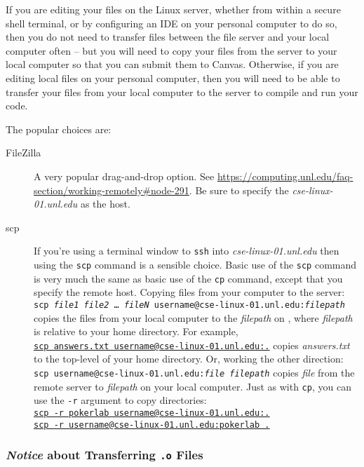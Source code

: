If you are editing your files on the Linux server, whether from within a secure shell terminal, or by configuring an IDE on your personal computer to do so,
then you do not need to transfer files between the file server and your local computer often -- but you will need to copy your files from the server to your local computer so that you can submit them to Canvas.
Otherwise, if you are editing local files on your personal computer, then you will need to be able to transfer your files from your local computer to the server to compile and run your code.

The popular choices are:
\begin{description}
    \item[FileZilla] A very popular drag-and-drop option.
        See \url{https://computing.unl.edu/faq-section/working-remotely#node-291}.
        Be sure to specify the \textit{cse-linux-01.unl.edu} as the host.
    \item[scp] If you're using a terminal window to \texttt{ssh} into \textit{cse-linux-01.unl.edu} then using the \texttt{scp} command is a sensible choice.
        Basic use of the \texttt{scp} command is very much the same as basic use of the \texttt{cp} command, except that you specify the remote host.
        Copying files from your computer to the server: \\
        \texttt{scp \textit{file1} \textit{file2} \dots\ \textit{fileN} username@cse-linux-01.unl.edu:\textit{filepath}} copies the files from your local computer to the \textit{filepath} on \runtimeenvironment, where \textit{filepath} is relative to your home directory.
        For example, \\
        \underline{\underline{\texttt{scp answers.txt username@cse-linux-01.unl.edu:.}}} copies \textit{answers.txt} to the top-level of your home directory.
        Or, working the other direction: \\
        \texttt{scp username@cse-linux-01.unl.edu:\textit{file} \textit{filepath}} copies \textit{file} from the remote server to \textit{filepath} on your local computer.
        Just as with \texttt{cp}, you can use the \texttt{-r} argument to copy directories: \\
        \underline{\underline{\texttt{scp -r pokerlab username@cse-linux-01.unl.edu:.}}} \\
        \underline{\underline{\texttt{scp -r username@cse-linux-01.unl.edu:pokerlab .}}}
\end{description}

\subsubsection*{\textit{Notice} about Transferring \texttt{.o} Files}

